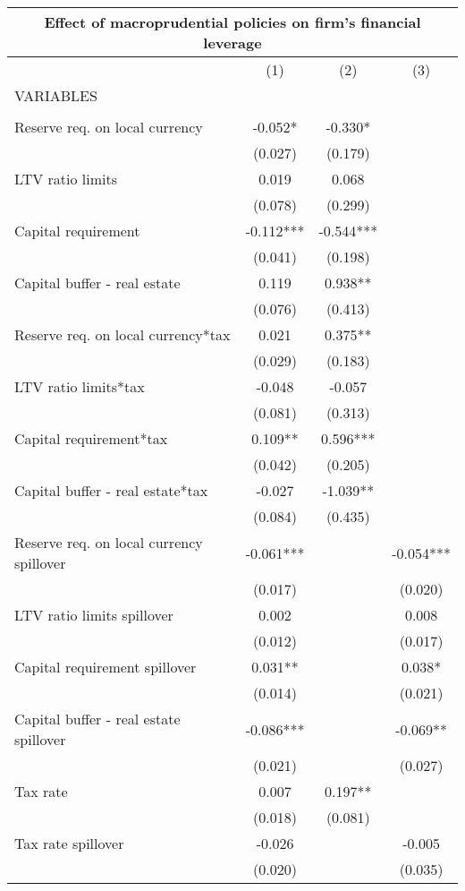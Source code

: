 \begin{tabular}{lccc}
\multicolumn{4}{c}{Effect of macroprudential policies on firm's financial leverage} \\ \hline
 & (1) & (2) & (3) \\
VARIABLES &  &  &  \\ \hline
 &  &  &  \\
Reserve req. on local currency & -0.052* & -0.330* &  \\
 & (0.027) & (0.179) &  \\
LTV ratio limits & 0.019 & 0.068 &  \\
 & (0.078) & (0.299) &  \\
Capital requirement & -0.112*** & -0.544*** &  \\
 & (0.041) & (0.198) &  \\
Capital buffer - real estate & 0.119 & 0.938** &  \\
 & (0.076) & (0.413) &  \\
Reserve req. on local currency*tax & 0.021 & 0.375** &  \\
 & (0.029) & (0.183) &  \\
LTV ratio limits*tax & -0.048 & -0.057 &  \\
 & (0.081) & (0.313) &  \\
Capital requirement*tax & 0.109** & 0.596*** &  \\
 & (0.042) & (0.205) &  \\
Capital buffer - real estate*tax & -0.027 & -1.039** &  \\
 & (0.084) & (0.435) &  \\
Reserve req. on local currency spillover & -0.061*** &  & -0.054*** \\
 & (0.017) &  & (0.020) \\
LTV ratio limits spillover & 0.002 &  & 0.008 \\
 & (0.012) &  & (0.017) \\
Capital requirement spillover & 0.031** &  & 0.038* \\
 & (0.014) &  & (0.021) \\
Capital buffer - real estate spillover & -0.086*** &  & -0.069** \\
 & (0.021) &  & (0.027) \\
Tax rate & 0.007 & 0.197** &  \\
 & (0.018) & (0.081) &  \\
Tax rate spillover & -0.026 &  & -0.005 \\
 & (0.020) &  & (0.035) \\

\end{tabular}

